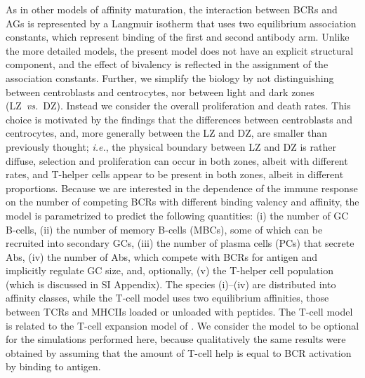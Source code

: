 \documentclass[utf8]{frontiersHLTH}%
\newcommand{\vo}[1]{#1} %
\def\ie {{\it i.e.}}
\def\vs {{\it vs.}}
\newcommand{\SI}{SI Appendix}
\begin{document}
As in other models of affinity maturation,\cite{zhang10,wang15} the
interaction between BCRs and AGs is represented by a Langmuir
isotherm that uses two equilibrium association constants, which represent
binding of the first and second antibody arm.  
Unlike the more detailed models,\cite{robert18,amitai20} 
the present model does not have an explicit structural component,
and the effect of bivalency is reflected in the assignment of the association constants.
Further, we simplify the \vo{biology} by not distinguishing between centroblasts and centrocytes, nor
between light and dark zones (LZ~\vs~DZ).  Instead we consider the overall
proliferation and death rates. This choice is motivated by the findings
that the differences between centroblasts and centrocytes, and, more
generally between the LZ and DZ, are smaller than previously
thought;\cite{allen07} \ie, the physical boundary between LZ and DZ is
rather diffuse, selection and proliferation can occur in both zones,
albeit with different rates, and T-helper cells appear to be present in
both zones, albeit in different proportions. Because we are interested
in the dependence of the immune response on the
number of competing BCRs with different binding valency and affinity, the model is parametrized
to \vo{predict} the following quantities: (i) the number of GC B-cells, (ii) the
number of memory
B-cells (MBCs), some of which can be recruited into secondary GCs, (iii) the
number of plasma
cells (PCs) that secrete Abs, (iv) the number of Abs, which compete with BCRs for
antigen and implicitly regulate GC size,\cite{zhang13} and, optionally, (v) the T-helper cell
population (which is discussed in \SI). The species (i)--(iv) are distributed into affinity classes,
while the T-cell model uses two equilibrium affinities, those between TCRs
and MHCIIs loaded or unloaded with peptides. The T-cell model is related
to the T-cell expansion model of \citet{mayer19}.  We consider the model to be 
optional for the simulations performed here, because qualitatively the
same results were obtained by assuming that the amount of T-cell help is
equal to BCR activation by binding to antigen.
\end{document}
